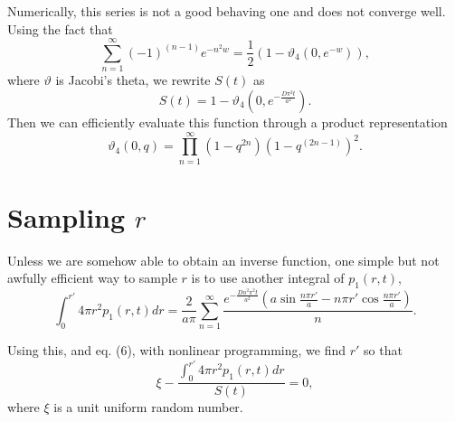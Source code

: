 \documentclass{article}
\begin{document}
Numerically, this series is not a good behaving one and does not converge well.
Using the fact that
\begin{equation}
\sum_{n=1}^{\infty} (-1)^{(n-1)} e^{- n^2 w} = 
\frac{1}{2} ( 1 - \vartheta_4( 0, e^{-w} ) ),
\end{equation}
where $\vartheta$ is Jacobi's theta, we rewrite $S(t)$ as 
\begin{equation}
S(t) = 1 - \vartheta_4( 0, e^{- \frac{D \pi^2 t}{a^2}} ).
\end{equation}
Then we can efficiently evaluate this function through a product 
representation
\begin{equation}
\vartheta_4( 0, q ) = \prod_{n=1}^{\infty} (1-q^{2n})(1-q^{(2n-1)})^2.
\end{equation}

\section{Sampling $r$}

Unless we are somehow able to obtain an inverse function, one
simple but not awfully efficient way to sample $r$ is to use another
integral of $p_1(r,t)$,
\begin{equation}
\int_{0}^{r'} 4 \pi r^2 p_1(r,t) dr = \frac{2}{a \pi} 
\sum_{n=1}^{\infty} \frac{e^{- \frac{D n^2 \pi^2 t}{a^2}}
\left( a \sin \frac{n \pi r'}{a} - n \pi r' \cos \frac{n \pi r'}{a} \right)}
{n}.
\end{equation}

Using this, and eq. (6), with nonlinear programming, we find $r'$ so that
\begin{equation}
\xi - \frac{\int_{0}^{r'} 4 \pi r^2 p_1(r,t) dr}{S(t)} = 0,
\end{equation}
where $\xi$ is a unit uniform random number.
\end{document}

